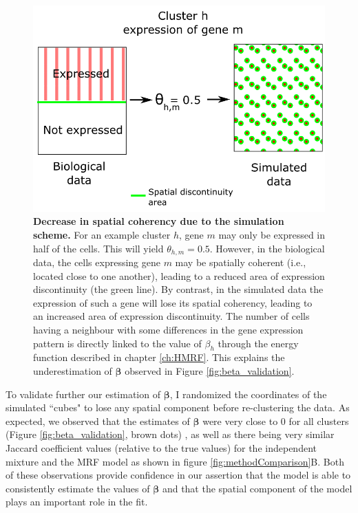 	\begin{figure}[H]
\centerline{\includegraphics[width=0.8\linewidth]{gfx/chapter5/beta_error.png}}
\caption{{\bf Decrease in spatial coherency due to the simulation scheme.} For an example cluster $h$, gene $m$ may only be expressed in half of the cells. This will yield $\theta_{h,m} = 0.5$. However, in the biological data, the cells expressing gene $m$ may be spatially coherent (i.e., located close to one another), leading to a reduced area of expression discontinuity (the green line). By contrast, in the simulated data the expression of such a gene will lose its spatial coherency, leading to an increased area of expression discontinuity. The number of cells having a neighbour with some differences in the gene expression pattern is directly linked to the value of $\beta_h$ through the energy function described in chapter \ref{ch:HMRF}. This explains the underestimation of $\boldsymbol{\beta}$ observed in Figure \ref{fig:beta_validation}.}
\label{fig:beta_error}
	\end{figure}

To validate further our estimation of $\boldsymbol{\beta}$, I randomized the coordinates of the simulated ``cubes" to lose any spatial component before re-clustering the data. As expected, we observed that the estimates of $\boldsymbol{\beta}$ were very close to $0$ for all clusters (Figure \ref{fig:beta_validation}, brown dots) , as well as there being very similar Jaccard coefficient values (relative to the true values) for the independent mixture and the MRF model as shown in figure \ref{fig:methodComparison}B. Both of these observations provide confidence in our assertion that the model is able to consistently estimate the values of $\boldsymbol{\beta}$ and that the spatial component of the model plays an important role in the fit.\\
	
